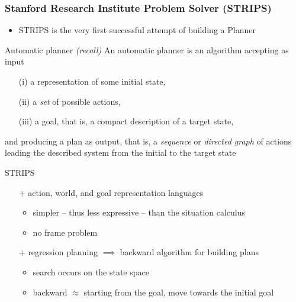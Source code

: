 \documentclass[presentation]{beamer}\mode<presentation>{\usetheme{AMSBolognaFC}}
\begin{document}
\begin{frame}[allowframebreaks]
\frametitle{Stanford Research Institute Problem Solver (STRIPS)}

\begin{itemize}
	\item STRIPS is the very first successful attempt of building a Planner
\end{itemize}


\begin{block}{Automatic planner \textit{(recall)}}
    An \alert{automatic planner} is an algorithm accepting as input
	\begin{itemize}
		\item[(i)] a representation of some \alert{initial state},
		\item[(ii)] a \emph{set} of possible \alert{actions},
		\item[(iii)] a \alert{goal}, that is, a compact description of a target state,
	\end{itemize}
	and producing a \alert{plan} as output, that is, a \emph{sequence} or \emph{directed graph} of actions leading the described system from the initial to the target state

\end{block}

\vfill

\begin{block}{STRIPS}
	\begin{itemize}
		\item[+] action, world, and goal \alert{representation languages}
		\begin{itemize}
			\item simpler -- thus less expressive -- than the situation calculus
			\item no frame problem
		\end{itemize}
		\item[+] \alert{regression} planning $\implies$ \alert{backward} algorithm for building plans
		\begin{itemize}
		    \item search occurs on the \alert{state space}
			\item backward $\approx$ starting from the goal, move towards the initial goal
		\end{itemize}
	\end{itemize}
\end{block}

\end{frame}
\end{document}
